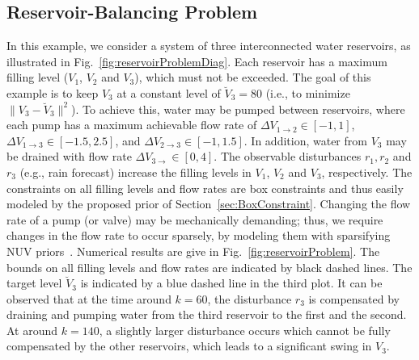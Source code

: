 \documentclass[conference]{IEEEtran}
\begin{document}
\subsection{Reservoir-Balancing Problem}
In this example, we consider a system of three interconnected water reservoirs,
as illustrated in Fig.~\ref{fig:reservoirProblemDiag}. Each reservoir has a
maximum filling level ($V_1$, $V_2$ and $V_3$), which must not be exceeded. The
goal of this example is to keep $V_3$ at a constant level of
$\breve V_3 = 80$ (i.e., to minimize $\| V_3 - \breve V_3\|^2$). 
To achieve this, water may be pumped between reservoirs,
where each pump has a maximum achievable flow rate of 
$\Delta V_{1 \rightarrow
2} \in [-1,1]$,
$\Delta V_{1 \rightarrow 3} \in [-1.5,2.5]$,
and
$\Delta V_{2 \rightarrow 3} \in [-1,1.5]$.
In addition, water from $V_3$ may be drained with flow rate $\Delta V_{3
\rightarrow } \in [0,4]$. 
The observable disturbances $r_1, r_2$ and $r_3$ (e.g., rain
forecast) increase the filling levels in $V_1$, $V_2$ and $V_3$, respectively.
The constraints on all filling levels and flow rates are box constraints and
thus easily modeled by the proposed prior of Section~\ref{sec:BoxConstraint}.
Changing the flow rate of a pump (or valve) may be mechanically demanding; thus,
we require changes in the flow rate to occur sparsely, by modeling them
with sparsifying NUV priors~\cite{loeliger_sparsity_2016}.
Numerical results are give in Fig.~\ref{fig:reservoirProblem}. The bounds on
all filling levels and flow rates are indicated by black dashed lines. The
target level $\breve V_3$ is indicated by a blue dashed line in the third plot.
It can be observed that at the time around $k=60$, the disturbance $r_3$
is compensated by draining and pumping water from the third reservoir to the
first and the second. At around $k=140$, a slightly larger disturbance occurs
which cannot be fully compensated by the other reservoirs, which leads to a
significant swing in $V_3$.
\end{document}
